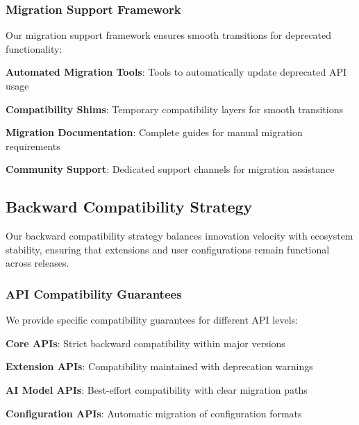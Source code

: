 \subsubsection*{Migration Support Framework}

Our migration support framework ensures smooth transitions for deprecated functionality:

\begin{compactlist}
    \item \textbf{Automated Migration Tools}: Tools to automatically update deprecated API usage
    \item \textbf{Compatibility Shims}: Temporary compatibility layers for smooth transitions
    \item \textbf{Migration Documentation}: Complete guides for manual migration requirements
    \item \textbf{Community Support}: Dedicated support channels for migration assistance
\end{compactlist}

\subsection*{Backward Compatibility Strategy}

Our backward compatibility strategy balances innovation velocity with ecosystem stability, ensuring that extensions and user configurations remain functional across releases.

\subsubsection*{API Compatibility Guarantees}

We provide specific compatibility guarantees for different API levels:

\begin{expandedlist}
    \item \textbf{Core APIs}: Strict backward compatibility within major versions
    \item \textbf{Extension APIs}: Compatibility maintained with deprecation warnings
    \item \textbf{AI Model APIs}: Best-effort compatibility with clear migration paths
    \item \textbf{Configuration APIs}: Automatic migration of configuration formats
\end{expandedlist}

